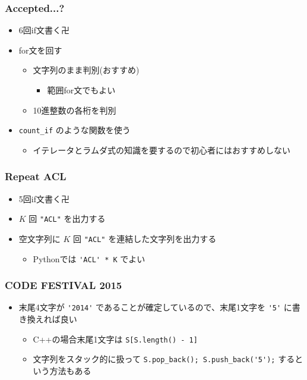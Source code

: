 \documentclass[t, aspectratio=169, dvipdfmx]{beamer}
\begin{document}
\begin{frame}[containsverbatim]
  \frametitle{Accepted...?}
  \begin{itemize}
    \item 6回if文書く卍
    \item for文を回す
    \begin{itemize}
      \item 文字列のまま判別(おすすめ)
      \begin{itemize}
        \item 範囲for文でもよい
      \end{itemize}
      \item 10進整数の各桁を判別
    \end{itemize}
    \item \verb|count_if| のような関数を使う
    \begin{itemize}
      \item イテレータとラムダ式の知識を要するので初心者にはおすすめしない
    \end{itemize}
  \end{itemize}
\end{frame}

\begin{frame}[containsverbatim]
  \frametitle{Repeat ACL}
  \begin{itemize}
    \item 5回if文書く卍
    \item $K$ 回 \verb|"ACL"| を出力する
    \item 空文字列に $K$ 回 \verb|"ACL"| を連結した文字列を出力する
    \begin{itemize}
      \item Pythonでは \verb|'ACL' * K| でよい
    \end{itemize}
  \end{itemize}
\end{frame}

\begin{frame}[containsverbatim]
  \frametitle{CODE FESTIVAL 2015}
  \begin{itemize}
    \item 末尾4文字が \verb|'2014'| であることが確定しているので、末尾1文字を \verb|'5'| に書き換えれば良い
    \begin{itemize}
      \item C++の場合末尾1文字は \verb|S[S.length() - 1]|
      \item 文字列をスタック的に扱って \verb|S.pop_back(); S.push_back('5');| するという方法もある
    \end{itemize}
  \end{itemize}
\end{frame}
\end{document}

